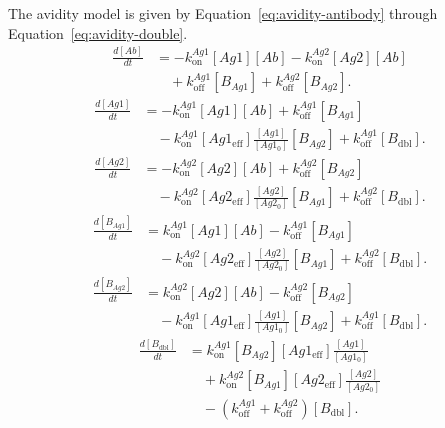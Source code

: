 \documentclass[11pt]{article}
\begin{document}
The avidity model is given by Equation~\ref{eq:avidity-antibody} through Equation~\ref{eq:avidity-double}.
\begin{equation}
\begin{aligned}
\frac{d[Ab]}{dt} &= -k_{\mathrm{on}}^{Ag1}[Ag1][Ab]-k_{\mathrm{on}}^{Ag2}[Ag2][Ab]\\ &\quad+k_{\mathrm{off}}^{Ag1}[B_{Ag1}]+k_{\mathrm{off}}^{Ag2}[B_{Ag2}].
\end{aligned}
\label{eq:avidity-antibody}
\end{equation}
\begin{equation}
\begin{aligned}
\frac{d[Ag1]}{dt} &= -k_{\mathrm{on}}^{Ag1}[Ag1][Ab]+k_{\mathrm{off}}^{Ag1}[B_{Ag1}]\\ &\quad-k_{\mathrm{on}}^{Ag1}[Ag1_{\mathrm{eff}}]\frac{[Ag1]}{[Ag1_0]}[B_{Ag2}]+k_{\mathrm{off}}^{Ag1}[B_{\mathrm{dbl}}].
\end{aligned}
\label{eq:avidity-ag1}
\end{equation}
\begin{equation}
\begin{aligned}
\frac{d[Ag2]}{dt} &= -k_{\mathrm{on}}^{Ag2}[Ag2][Ab]+k_{\mathrm{off}}^{Ag2}[B_{Ag2}]\\ &\quad-k_{\mathrm{on}}^{Ag2}[Ag2_{\mathrm{eff}}]\frac{[Ag2]}{[Ag2_0]}[B_{Ag1}]+k_{\mathrm{off}}^{Ag2}[B_{\mathrm{dbl}}].
\end{aligned}
\label{eq:avidity-ag2}
\end{equation}
\begin{equation}
\begin{aligned}
\frac{d[B_{Ag1}]}{dt} &= k_{\mathrm{on}}^{Ag1}[Ag1][Ab]-k_{\mathrm{off}}^{Ag1}[B_{Ag1}]\\ &\quad-k_{\mathrm{on}}^{Ag2}[Ag2_{\mathrm{eff}}]\frac{[Ag2]}{[Ag2_0]}[B_{Ag1}]+k_{\mathrm{off}}^{Ag2}[B_{\mathrm{dbl}}].
\end{aligned}
\label{eq:avidity-bag1}
\end{equation}
\begin{equation}
\begin{aligned}
\frac{d[B_{Ag2}]}{dt} &= k_{\mathrm{on}}^{Ag2}[Ag2][Ab]-k_{\mathrm{off}}^{Ag2}[B_{Ag2}]\\ &\quad-k_{\mathrm{on}}^{Ag1}[Ag1_{\mathrm{eff}}]\frac{[Ag1]}{[Ag1_0]}[B_{Ag2}]+k_{\mathrm{off}}^{Ag1}[B_{\mathrm{dbl}}].
\end{aligned}
\label{eq:avidity-bag2}
\end{equation}
\begin{equation}
\begin{aligned}
\frac{d[B_{\mathrm{dbl}}]}{dt} &= k_{\mathrm{on}}^{Ag1}[B_{Ag2}][Ag1_{\mathrm{eff}}]\frac{[Ag1]}{[Ag1_0]}\\ &\quad+k_{\mathrm{on}}^{Ag2}[B_{Ag1}][Ag2_{\mathrm{eff}}]\frac{[Ag2]}{[Ag2_0]}\\ &\quad-\left(k_{\mathrm{off}}^{Ag1}+k_{\mathrm{off}}^{Ag2}\right)[B_{\mathrm{dbl}}].
\end{aligned}
\label{eq:avidity-double}
\end{equation}
\end{document}
